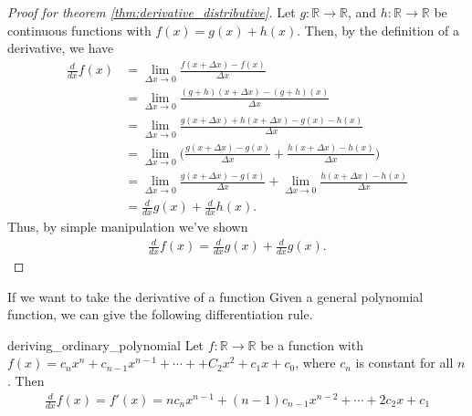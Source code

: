 \begin{proof}[Proof for theorem \ref{thm:derivative_distributive}]
	Let $g:\mathbb{R}\rightarrow\mathbb{R}$, and $h:\mathbb{R}\rightarrow\mathbb{R}$ be continuous functions with $f(x)=g(x)+h(x)$. Then, by the definition of a derivative, we have
	\begin{align*}
	\frac{d}{dx}f(x)&=\lim\limits_{\Delta x \rightarrow 0}\frac{f(x+\Delta x)-f(x)}{\Delta x} \\
	&=\lim\limits_{\Delta x \rightarrow 0}\frac{(g+h)(x+\Delta x)-(g+h)(x)}{\Delta x} \\
	&=\lim\limits_{\Delta x \rightarrow 0}\frac{g(x+\Delta x)+h(x+\Delta x)-g(x)-h(x)}{\Delta x} \\
	&=\lim\limits_{\Delta x \rightarrow 0}\bigg(\frac{g(x+\Delta x)-g(x)}{\Delta x}+\frac{h(x+\Delta x)-h(x)}{\Delta x}\bigg) \\
	&=\lim\limits_{\Delta x \rightarrow 0}\frac{g(x+\Delta x)-g(x)}{\Delta x}+\lim\limits_{\Delta x \rightarrow 0}\frac{h(x+\Delta x)-h(x)}{\Delta x} \\
	&= \frac{d}{dx}g(x)+\frac{d}{dx}h(x).
	\end{align*}
	Thus, by simple manipulation we've shown
	\begin{align*}
	\frac{d}{dx}f(x)= \frac{d}{dx}g(x)+\frac{d}{dx}g(x).
	\end{align*}
\end{proof}
If we want to take the derivative of a function
Given a general polynomial function, we can give the following differentiation rule.
\begin{theo}{deriving_ordinary_polynomial}
	Let $f:\mathbb{R}\rightarrow\mathbb{R}$ be a function with $f(x)=c_nx^n+c_{n-1}x^{n-1}+\cdots++C_2x^2+c_1x+c_0$, where $c_n$ is constant for all $n$. Then
	\begin{align*}
	\frac{d}{dx}f(x)=f'(x)=nc_nx^{n-1}+(n-1)c_{n-1}x^{n-2}+\cdots+2c_2x+c_1
	\end{align*}
\end{theo}
